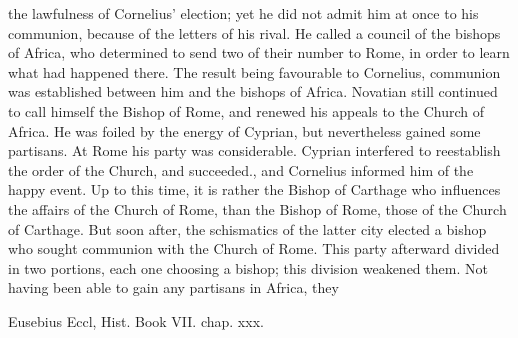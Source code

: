 the lawfulness of Cornelius' election; yet he did not admit him at once to his communion, because of the letters of his rival. He called a council of the bishops of Africa, who determined to send two of their number to Rome, in order to learn what had happened there. The result being favourable to Cornelius, communion was established between him and the bishops of Africa. Novatian still continued to call himself the Bishop of Rome, and renewed his appeals to the Church of Africa. He was foiled by the energy of Cyprian, but nevertheless gained some partisans. At Rome his party was considerable. Cyprian interfered to reestablish the order of the Church, and succeeded., and Cornelius informed him of the happy event. Up to this time, it is rather the Bishop of Carthage who influences the affairs of the Church of Rome, than the Bishop of Rome, those of the Church of Carthage. But soon after, the schismatics of the latter city elected a bishop who sought communion with the Church of Rome. This party afterward divided in two portions, each one choosing a bishop; this division weakened them. Not having been able to gain any partisans in Africa, they

Eusebius Eccl, Hist. Book VII. chap. xxx.

